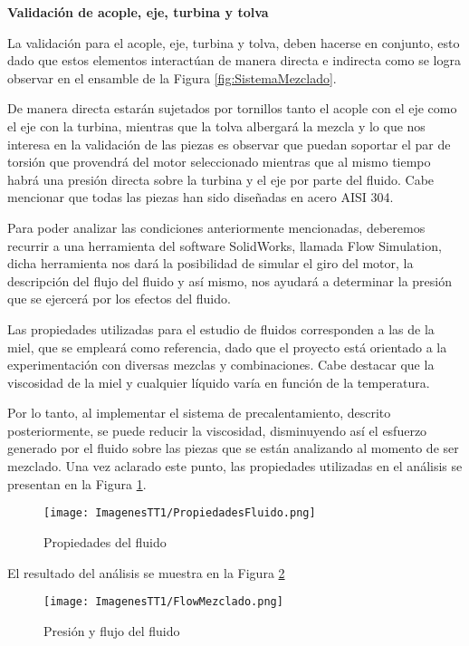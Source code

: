 \documentclass[14pt,oneside]{extarticle} %
\begin{document}
\textbf{Validación de acople, eje, turbina y tolva}

La validación para el acople, eje, turbina y tolva, deben hacerse en conjunto, esto dado que estos elementos interactúan de manera directa e indirecta como se logra observar en el ensamble de la Figura \ref{fig:SistemaMezclado}. 

De manera directa estarán sujetados por tornillos tanto el acople con el eje como el eje con la turbina, mientras que la tolva albergará la mezcla y lo que nos interesa en la validación de las piezas es observar que puedan soportar el par de torsión que provendrá del motor seleccionado mientras que al mismo tiempo habrá una presión directa sobre la turbina y el eje por parte del fluido. Cabe mencionar que todas las piezas han sido diseñadas en acero AISI 304.

Para poder analizar las condiciones anteriormente mencionadas, deberemos recurrir a una herramienta del software SolidWorks\textregistered, llamada Flow Simulation, dicha herramienta nos dará la posibilidad de simular el giro del motor, la descripción del flujo del fluido y así mismo, nos ayudará a determinar la presión que se ejercerá por los efectos del fluido.

Las propiedades utilizadas para el estudio de fluidos corresponden a las de la miel, que se empleará como referencia, dado que el proyecto está orientado a la experimentación con diversas mezclas y combinaciones. Cabe destacar que la viscosidad de la miel y cualquier líquido varía en función de la temperatura. 

Por lo tanto, al implementar el sistema de precalentamiento, descrito posteriormente, se puede reducir la viscosidad, disminuyendo así el esfuerzo generado por el fluido sobre las piezas que se están analizando al momento de ser mezclado. Una vez aclarado este punto, las propiedades utilizadas en el análisis se presentan en la Figura \ref{fig:PropiedadesFluido}.

\begin{figure}[H]
    \centering
    \texttt{[image: ImagenesTT1/PropiedadesFluido.png]}
    \caption{Propiedades del fluido}
    \label{fig:PropiedadesFluido}
\end{figure}

El resultado del análisis se muestra en la Figura \ref{fig:FlowMezclado}

\begin{figure}[H]
    \centering
    \texttt{[image: ImagenesTT1/FlowMezclado.png]}
    \caption{Presión y flujo del fluido}
    \label{fig:FlowMezclado}
\end{figure}
\end{document}
